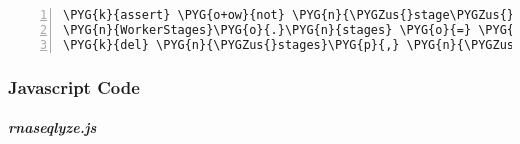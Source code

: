 \begin{Verbatim}[commandchars=\\\{\},numbers=left,firstnumber=1,stepnumber=5]
\PYG{k}{assert} \PYG{o+ow}{not} \PYG{n}{\PYGZus{}stage\PYGZus{}conds}\PYG{p}{,} \PYG{l+s}{"}\PYG{l+s}{@stage\PYGZus{}cond}\PYG{l+s}{'}\PYG{l+s}{s must be declared before @stage}\PYG{l+s}{'}\PYG{l+s}{s}\PYG{l+s}{"}
\PYG{n}{WorkerStages}\PYG{o}{.}\PYG{n}{stages} \PYG{o}{=} \PYG{n}{\PYGZus{}stages}
\PYG{k}{del} \PYG{n}{\PYGZus{}stages}\PYG{p}{,} \PYG{n}{\PYGZus{}stage\PYGZus{}conds}
\end{Verbatim}


\subsubsection{Javascript Code}
\label{rnaseqlyze-pdf:javascript-code}

\paragraph{\emph{rnaseqlyze.js}}
\label{rnaseqlyze-pdf:rnaseqlyze-js}
